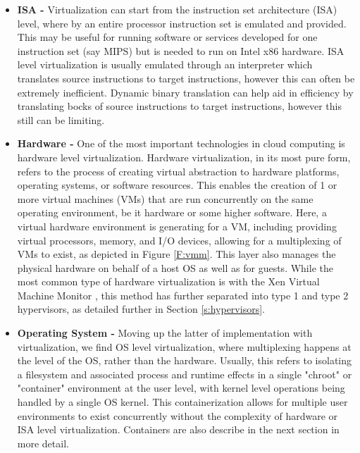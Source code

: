 \begin{itemize}

\item \textbf{ISA - }
Virtualization can start from the instruction set architecture (ISA) level, where by an entire processor instruction set is emulated and provided.  This may be useful for running software or services developed for one instruction set (say MIPS) but is needed to run on Intel x86 hardware. ISA level virtualization is usually emulated through an interpreter which translates source instructions to target instructions, however this can often be extremely inefficient.  Dynamic binary translation can help aid in efficiency by translating bocks of source instructions to target instructions, however this still can be limiting.   

\item \textbf{Hardware - }
One of the most important technologies in cloud computing is hardware level virtualization\cite{Barham2003, ESX}. Hardware virtualization, in its most pure form, refers to the process of creating virtual abstraction to hardware platforms, operating systems, or software resources. This enables the creation of 1 or more virtual machines (VMs) that are run concurrently on the same operating environment, be it hardware or some higher software. Here, a virtual hardware environment is generating for a VM, including providing virtual processors, memory, and I/O devices, allowing for a multiplexing of VMs to exist, as depicted in Figure \ref{F:vmm}.  This layer also manages the physical hardware on behalf of a host OS as well as for guests. While the most common type of hardware virtualization is with the Xen Virtual Machine Monitor \cite{Barham2003}, this method has further separated into type 1 and type 2 hypervisors, as detailed further in Section \ref{s:hypervisors}.  

\item \textbf{Operating System - }
Moving up the latter of implementation with virtualization, we find OS level virtualization, where multiplexing happens at the level of the OS, rather than the hardware. Usually, this refers to isolating a filesystem and associated process and runtime effects in a single "chroot" or "container" environment at the user level, with kernel level operations being handled by a single OS kernel. This containerization allows for multiple user environments to exist concurrently without the complexity of hardware or ISA level virtualization.  Containers are also describe in the next section in more detail.


\end{itemize}
